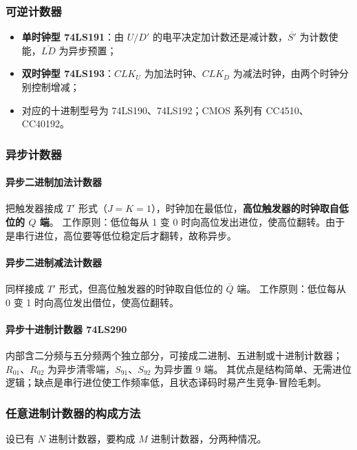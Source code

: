 \subsubsection{可逆计数器}
\begin{itemize}
    \item \textbf{单时钟型 74LS191}：由 $U/D'$ 的电平决定加计数还是减计数，$\overline{S'}$ 为计数使能，$\overline{LD}$ 为异步预置；
    \item \textbf{双时钟型 74LS193}：$CLK_U$ 为加法时钟、$CLK_D$ 为减法时钟，由两个时钟分别控制增减；
    \item 对应的十进制型号为 74LS190、74LS192；CMOS 系列有 CC4510、CC40192。
\end{itemize}

\subsubsection{异步计数器}
\paragraph{异步二进制加法计数器}
把触发器接成 $T'$ 形式（$J=K=1$），时钟加在最低位，\textbf{高位触发器的时钟取自低位的 $Q$ 端}。
工作原则：低位每从 1 变 0 时向高位发出进位，使高位翻转。由于是串行进位，高位要等低位稳定后才翻转，故称异步。

\paragraph{异步二进制减法计数器}
同样接成 $T'$ 形式，但高位触发器的时钟取自低位的 $\overline{Q}$ 端。
工作原则：低位每从 0 变 1 时向高位发出借位，使高位翻转。

\paragraph{异步十进制计数器 74LS290}
内部含二分频与五分频两个独立部分，可接成二进制、五进制或十进制计数器；
$R_{01}$、$R_{02}$ 为异步清零端，$S_{91}$、$S_{92}$ 为异步置 9 端。
其优点是结构简单、无需进位逻辑；缺点是串行进位使工作频率低，且状态译码时易产生竞争-冒险毛刺。

\subsubsection{任意进制计数器的构成方法}
\label{sec:arb_counter}
设已有 $N$ 进制计数器，要构成 $M$ 进制计数器，分两种情况。

